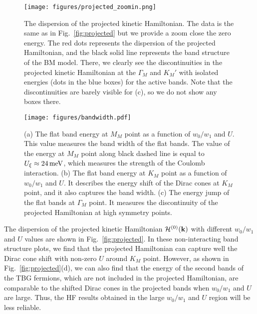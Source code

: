 \documentclass[prb,aps,nofootinbib,amssymb,twocolumn,superscriptaddress,10pt]{revtex4-2}
\begin{document}
\begin{widetext}
\begin{figure}
    \centering
    \texttt{[image: figures/projected\_zoomin.png]}
    \caption{The dispersion of the projected kinetic Hamiltonian. The data is the same as in Fig.~\ref{fig:projected} but we provide a zoom close the zero energy. The red dots represents the dispersion of the projected Hamiltonian, and the black solid line represents the band structure of the BM model. There, we clearly see the discontinuities in the projected kinetic Hamiltonian at the $\Gamma_M$ and $K_M'$ with isolated energies (dots in the blue boxes) for the active bands. Note that the discontinuities are barely visible for (c), so we do not show any boxes there.}
    \label{fig:projected_zoomin}
\end{figure}

\begin{figure}
    \centering
    \texttt{[image: figures/bandwidth.pdf]}
    \caption{(a) The flat band energy at $M_M$ point as a function of $w_0/w_1$ and $U$. This value measures the band width of the flat bands. The value of the energy at $M_M$ point along black dashed line is equal to $U_\xi \approx 24\,\rm meV$, which measures the strength of the Coulomb interaction. (b) The flat band energy at $K_M$ point as a function of $w_0/w_1$ and $U$. It describes the energy shift of the Dirac cones at $K_M$ point, and it also captures the band width. (c) The energy jump of the flat bands at $\Gamma_M$ point. It measures the discontinuity of the projected Hamiltonian at high symmetry points.}
    \label{fig:bandwidth}
\end{figure}

The dispersion of the projected kinetic Hamiltonian $\mathcal{H}^{(0)}(\mathbf{k})$ with different $w_0/w_1$ and $U$ values are shown in Fig.~\ref{fig:projected}. In these non-interacting band structure plots, we find that the projected Hamiltonian can capture well the Dirac cone shift with non-zero $U$ around $K_M$ point. However, as shown in Fig.~\ref{fig:projected}(d), we can also find that the energy of the second bands of the TBG fermions, which are not included in the projected Hamiltonian, are comparable to the shifted Dirac cones in the projected bands when $w_0/w_1$ and $U$ are large. Thus, the HF results obtained in the large $w_0/w_1$ and $U$ region will be less reliable.


\end{widetext}
\end{document}
